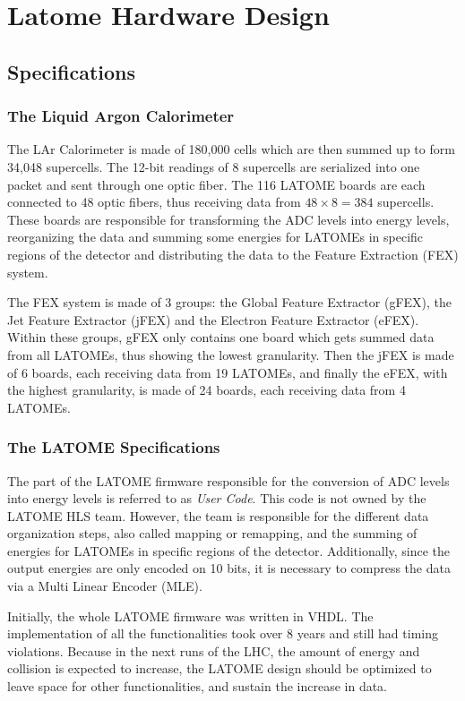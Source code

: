\chapter{Latome Hardware Design}\label{sec:latome-firmware}

\section{Specifications}\label{sec:specifications}
\subsection{The Liquid Argon Calorimeter}\label{sec:lar}
The LAr Calorimeter is made of 180,000 cells which are then summed up to form 34,048 supercells. The 12-bit readings of 8 supercells are serialized into one packet and sent through one optic fiber. The 116 LATOME boards are each connected to 48 optic fibers, thus receiving data from \(48\times8=384\) supercells. These boards are responsible for transforming the ADC levels into energy levels, reorganizing the data and summing some energies for LATOMEs in specific regions of the detector and distributing the data to the Feature Extraction (FEX) system.

The FEX system is made of 3 groups: the Global Feature Extractor (gFEX), the Jet Feature Extractor (jFEX) and the Electron Feature Extractor (eFEX). Within these groups, gFEX only contains one board which gets summed data from all LATOMEs, thus showing the lowest granularity. Then the jFEX is made of 6 boards, each receiving data from 19 LATOMEs, and finally the eFEX, with the highest granularity, is made of 24 boards, each receiving data from 4 LATOMEs.

\subsection{The LATOME Specifications}\label{sec:latome-specifications}
The part of the LATOME firmware responsible for the conversion of ADC levels into energy levels is referred to as \textit{User Code}. This code is not owned by the LATOME HLS team. However, the team is responsible for the different data organization steps, also called mapping or remapping, and the summing of energies for LATOMEs in specific regions of the detector. Additionally, since the output energies are only encoded on 10 bits, it is necessary to compress the data via a Multi Linear Encoder (MLE).

Initially, the whole LATOME firmware was written in VHDL. The implementation of all the functionalities took over 8 years and still had timing violations. Because in the next runs of the LHC, the amount of energy and collision is expected to increase, the LATOME design should be optimized to leave space for other functionalities, and sustain the increase in data.

